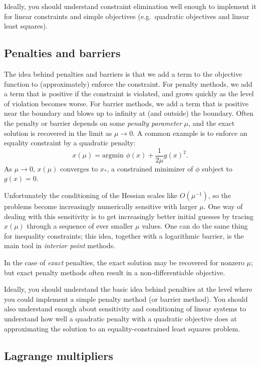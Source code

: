 \documentclass[12pt, leqno]{article}
\begin{document}
Ideally, you should understand constraint elimination well enough to
implement it for linear constraints and simple objectives
(e.g.~quadratic objectives and linear least squares).

\subsection{Penalties and barriers}

The idea behind penalties and barriers is that we add a term to
the objective function to (approximately) enforce the constraint.
For penalty methods, we add a term that is positive if the constraint
is violated, and grows quickly as the level of violation becomes
worse.  For barrier methods, we add a term that is positive near the
boundary and blows up to infinity at (and outside) the boundary.
Often the penalty or barrier depends on some {\em penalty parameter} $\mu$,
and the exact solution is recovered in the limit as $\mu \rightarrow 0$.
A common example is to enforce an equality constraint by a quadratic
penalty:
\[
  x(\mu) = \mbox{argmin } \phi(x) + \frac{1}{2\mu} g(x)^2.
\]
As $\mu \rightarrow 0$, $x(\mu)$ converges to $x_*$, a constrained
minimizer of $\phi$ subject to $g(x) = 0$.

Unfortunately the conditioning of the Hessian scales like
$O(\mu^{-1})$, so the problems become increasingly numerically
sensitive with larger $\mu$.  One way of dealing with this sensitivity
is to get increasingly better initial guesses by tracing $x(\mu)$
through a sequence of ever smaller $\mu$ values.  One can do the same
thing for inequality constraints; this idea, together with a
logarithmic barrier, is the main tool in {\em interior point} methods.

In the case of {\em exact} penalties, the exact solution may be
recovered for nonzero $\mu$; but exact penalty methods often result
in a non-differentiable objective.

Ideally, you should understand the basic idea behind penalties at the
level where you could implement a simple penalty method (or barrier
method).  You should also understand enough about sensitivity and
conditioning of linear systems to understand how well a quadratic
penalty with a quadratic objective does at approximating the solution
to an equality-constrained least squares problem.

\subsection{Lagrange multipliers}
\end{document}
